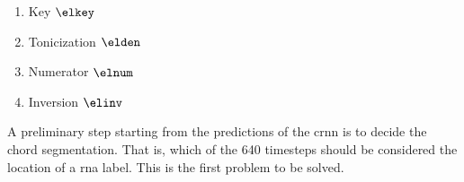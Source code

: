 \begin{enumerate}
    \item Key $\elkey$
    \item Tonicization $\elden$
    \item Numerator $\elnum$
    \item Inversion $\elinv$
\end{enumerate}

A preliminary step starting from the predictions of the
\gls{crnn} is to decide the chord segmentation. That is,
which of the 640 timesteps should be considered the location
of a \gls{rna} label. This is the first problem to be
solved.









